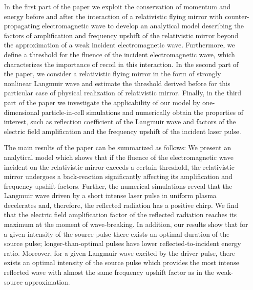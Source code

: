 \documentclass[10pt, a4paper, twoside, openright]{report}
\begin{document}
In the first part of the paper we exploit the conservation of momentum and energy before and after the interaction of a relativistic flying mirror with counter-propagating electromagnetic wave to develop an analytical model describing the factors of amplification and frequency upshift of the relativistic mirror beyond the approximation of a weak incident electromagnetic wave. Furthermore, we define a threshold for the fluence of the incident electromagnetic wave, which characterizes the importance of recoil in this interaction. In the second part of the paper, we consider a relativistic flying mirror in the form of strongly nonlinear Langmuir wave and estimate the threshold derived before for this particular case of physical realization of relativistic mirror. Finally, in the third part of the paper we investigate the applicability of our model by one-dimensional particle-in-cell simulations and numerically obtain the properties of interest, such as reflection coefficient of the Langmuir wave and factors of the electric field amplification and the frequency upshift of the incident laser pulse.

The main results of the paper can be summarized as follows: We present an analytical model which shows that if the fluence of the electromagnetic wave incident on the relativistic mirror exceeds a certain threshold, the relativistic mirror undergoes a back-reaction significantly affecting its amplification and frequency upshift factors. Further, the numerical simulations reveal that the Langmuir wave driven by a short intense laser pulse in uniform plasma decelerates and, therefore, the reflected radiation has a positive chirp. We find that the electric field amplification factor of the reflected radiation reaches its maximum at the moment of wave-breaking. In addition, our results show that for a given intensity of the source pulse there exists an optimal duration of the source pulse; longer-than-optimal pulses have lower reflected-to-incident energy ratio. Moreover, for a given Langmuir wave excited by the driver pulse, there exists an optimal intensity of the source pulse which provides the most intense reflected wave with almost the same frequency upshift factor as in the weak-source approximation.
\end{document}
